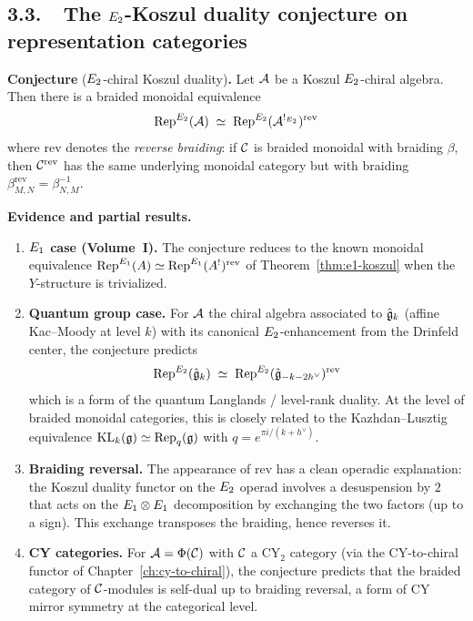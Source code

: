 \subsection*{3.3.\ \ The $E_2$-Koszul duality conjecture on
 representation categories}

\medskip
\noindent\textbf{Conjecture} ($E_2$-chiral Koszul duality)\textbf{.}\;
Let $\mathcal{A}$ be a Koszul $E_2$-chiral algebra. Then there is a braided
monoidal equivalence
\begin{equation}\label{eq:e2-koszul-rep}
 \mathrm{Rep}^{E_2}(\mathcal{A})
 \;\simeq\;
 \mathrm{Rep}^{E_2}(\mathcal{A}^{!_{E_2}})^{\mathrm{rev}}
\end{equation}
where $\mathrm{rev}$ denotes the \emph{reverse braiding}: if $\mathcal{C}$
is braided monoidal with braiding $\beta$, then $\mathcal{C}^{\mathrm{rev}}$
has the same underlying monoidal category but with braiding
$\beta^{\mathrm{rev}}_{M,N} = \beta_{N,M}^{-1}$.

\medskip
\noindent\textbf{Evidence and partial results.}

\begin{enumerate}[label=(\arabic*)]
 \item \textbf{$E_1$ case (Volume~I).}
 The conjecture reduces to the known monoidal equivalence
 $\mathrm{Rep}^{E_1}(A) \simeq \mathrm{Rep}^{E_1}(A^!)^{\mathrm{rev}}$ of
 Theorem~\ref{thm:e1-koszul} when the $Y$-structure is trivialized.

 \item \textbf{Quantum group case.}
 For $\mathcal{A}$ the chiral algebra associated to $\hat{\mathfrak{g}}_k$
 (affine Kac--Moody at level $k$) with its canonical
 $E_2$-enhancement from the Drinfeld center, the conjecture
 predicts
 \[
 \mathrm{Rep}^{E_2}(\hat{\mathfrak{g}}_k)
 \;\simeq\;
 \mathrm{Rep}^{E_2}(\hat{\mathfrak{g}}_{-k-2h^\vee})^{\mathrm{rev}}
 \]
 which is a form of the quantum Langlands / level-rank duality.
 At the level of braided monoidal categories, this is closely
 related to the Kazhdan--Lusztig equivalence
 $\mathrm{KL}_k(\mathfrak{g}) \simeq \mathrm{Rep}_q(\mathfrak{g})$ with
 $q = e^{\pi i/(k + h^\vee)}$.

 \item \textbf{Braiding reversal.}
 The appearance of $\mathrm{rev}$ has a clean operadic explanation:
 the Koszul duality functor on the $E_2$ operad involves a
 desuspension by $2$ that acts on the $E_1 \otimes E_1$
 decomposition by exchanging the two factors (up to a sign).
 This exchange transposes the braiding, hence reverses it.

 \item \textbf{CY categories.}
 For $\mathcal{A} = \Phi(\mathcal{C})$ with $\mathcal{C}$ a CY$_2$ category (via the
 CY-to-chiral functor of Chapter~\ref{ch:cy-to-chiral}), the
 conjecture predicts that the braided category of $\mathcal{C}$-modules
 is self-dual up to braiding reversal, a form of CY mirror
 symmetry at the categorical level.
\end{enumerate}

